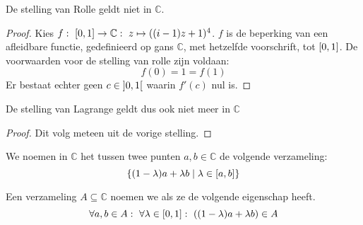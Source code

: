 \documentclass[main.tex]{subfiles}
\begin{document}
\begin{gst}
  De stelling van Rolle geldt niet in $\mathbb{C}$.

  \begin{proof}
    Kies $f:\ \interval{0}{1} \rightarrow \mathbb{C}:\ z \mapsto ((i-1)z+1)^{4}$.
    $f$ is de beperking van een afleidbare functie, gedefinieerd op gans $\mathbb{C}$, met hetzelfde voorschrift, tot $\interval{0}{1}$.
    De voorwaarden voor de stelling van rolle zijn voldaan:
    \[ f(0) = 1 = f(1) \]
    Er bestaat echter geen $c\in \interval[open]{0}{1}$ waarin $f'(c)$ nul is.
  \end{proof}
\end{gst}
\begin{gst}
  De stelling van Lagrange geldt dus ook niet meer in $\mathbb{C}$

  \begin{proof}
    Dit volg meteen uit de vorige stelling.
  \end{proof}
\end{gst}

\begin{de}
  We noemen in $\mathbb{C}$ het  tussen twee punten $a,b\in \mathbb{C}$ de volgende verzameling:
  \[ \{(1-\lambda)a+\lambda b\mid \lambda \in \interval{a}{b} \} \]
\end{de}

\begin{de}
  Een verzameling $A \subseteq \mathbb{C}$ noemen we  als ze de volgende eigenschap heeft.
  \[ \forall a,b \in A:\ \forall \lambda \in \interval{0}{1}:\ ((1-\lambda)a+\lambda b) \in A \]
\end{de}
\end{document}
